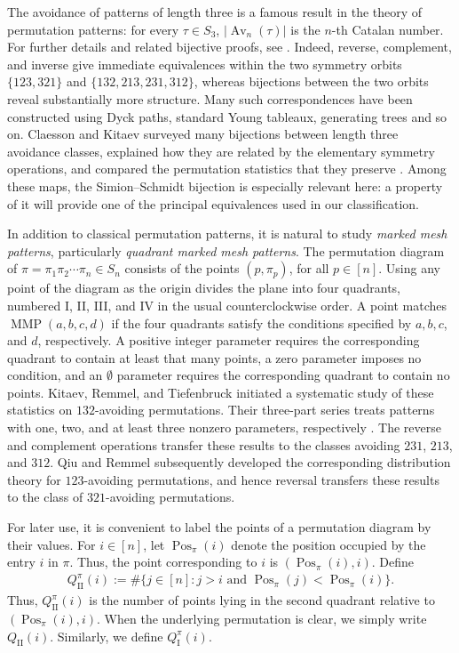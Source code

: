 \documentclass[11pt]{article}
\begin{document}
The avoidance of patterns of length three is a famous result in the theory of permutation patterns: for every $\tau\in S_3$,
$|\operatorname{Av}_n(\tau)|$ is the $n$-th Catalan number. For further details and related bijective proofs, see
\cite{Knuth1969,Knuth1973,Rotem1975}.
Indeed, reverse, complement, and inverse give immediate equivalences within the two symmetry
orbits $\{123,321\}$ and $\{132,213,231,312\}$,
whereas bijections between the two orbits reveal substantially more
structure. 
Many such correspondences have been constructed using Dyck
paths, standard Young tableaux, generating trees and so on.
Claesson and Kitaev surveyed many bijections
between length three avoidance classes, explained how they are related by
the elementary symmetry operations, and compared the permutation statistics
that they preserve \cite{ClaessonKitaev2008,Kitaev2011Patterns}. 
Among these maps, the Simion--Schmidt bijection \cite{SimionSchmidt1985} is especially relevant here: a property of it will
provide one of the principal equivalences used in our classification.

In addition to classical permutation patterns, it is natural to study
\emph{marked mesh patterns}, particularly \emph{quadrant marked mesh patterns}.
The permutation diagram of
$\pi=\pi_1\pi_2\cdots\pi_n\in S_n$ consists of the points
$(p,\pi_p)$, for all $p\in[n]$.
Using any point of the diagram as the origin divides the plane into
four quadrants, numbered I, II, III, and IV in the usual
counterclockwise order. 
A point matches $\operatorname{MMP}(a,b,c,d)$ if the four quadrants satisfy the
conditions specified by $a,b,c$, and $d$, respectively. 
A positive integer parameter requires the corresponding quadrant to contain at
least that many points, a zero parameter imposes no condition, and an
$\emptyset$ parameter requires the corresponding quadrant to contain
no points.
Kitaev, Remmel, and Tiefenbruck initiated a systematic study of these statistics on
$132$-avoiding permutations. 
Their three-part series treats patterns with
one, two, and at least three nonzero parameters, respectively
\cite{KitaevRemmelTiefenbruckI,KitaevRemmelTiefenbruckII,KitaevRemmelTiefenbruckIII}.
The reverse and complement operations transfer these results to the classes
avoiding $231$, $213$, and $312$. 
Qiu and Remmel \cite{QiuRemmel2018} subsequently developed the corresponding distribution theory 
for $123$-avoiding permutations, and hence reversal transfers these results to the class of $321$-avoiding permutations.

For later use, it is convenient to label the points of a permutation
diagram by their values. For $i\in[n]$, let
$\operatorname{Pos}_{\pi}(i)$ denote the position occupied by the entry
$i$ in $\pi$. Thus, the point corresponding to $i$ is
$(\operatorname{Pos}_{\pi}(i),i)$.
Define
\begin{align*}
Q_{\mathrm{II}}^\pi(i)
:=
\#\bigl\{
j\in[n]:
j>i\text{ and }
\operatorname{Pos}_{\pi}(j)<\operatorname{Pos}_{\pi}(i)
\bigr\}.
\end{align*}
Thus, $Q_{\mathrm{II}}^\pi(i)$ is the number of points lying in the
second quadrant relative to
$(\operatorname{Pos}_{\pi}(i),i)$. When the underlying permutation is
clear, we simply write $Q_{\mathrm{II}}(i)$. Similarly, we define $Q_{\mathrm{I}}^\pi(i)$.
\end{document}
